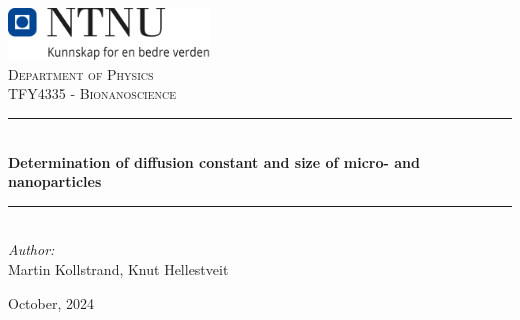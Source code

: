 \begin{titlepage}
\onecolumn
\vbox{ }
\vbox{ }
\begin{center}

\includegraphics[width=0.40\textwidth]{Images/NTNU_logo.png}\\[1cm]
\textsc{\LARGE Department of Physics}\\[1.5cm]
\textsc{\Large TFY4335 - Bionanoscience}\\[0.5cm]
\vbox{ }

\rule{\linewidth}{0.5mm} \\[0.4cm]
{ \huge \bfseries Determination of diffusion constant and size of micro- and nanoparticles}\\[0.4cm]
\rule{\linewidth}{0.5mm} \\[1.5cm]

\large
\emph{Author:}\\
Martin Kollstrand, Knut Hellestveit
\vfill

{\large October, 2024}

\end{center}
\end{titlepage}

